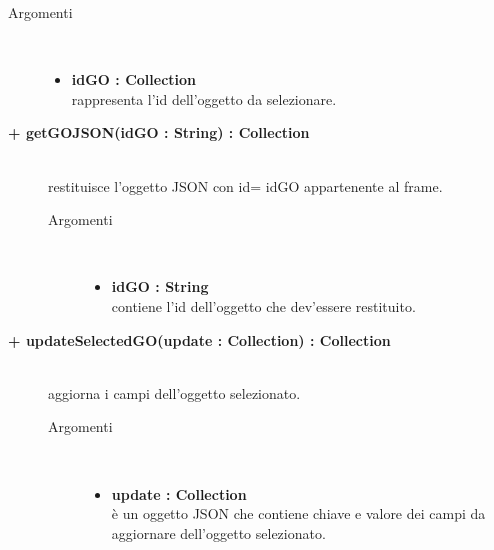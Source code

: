 \begin{description}
\begin{description}
\begin{description}
\begin{description}
			\item[Argomenti] \hfill \\
				\begin{itemize}
						\item \textbf{idGO : Collection			} \hfill \\
						rappresenta l'id dell'oggetto da selezionare.
				\end{itemize}

\end{description}

\end{description}

\begin{description}
		\item[\textbf{\color{blue}+ getGOJSON(idGO : String) : Collection			}] \hfill \\
			restituisce l'oggetto JSON con id= idGO appartenente al frame.   

\begin{description}
			\item[Argomenti] \hfill \\
				\begin{itemize}
						\item \textbf{idGO : String			} \hfill \\
					contiene l'id dell'oggetto che dev'essere restituito.
				\end{itemize}

\end{description}

\end{description}

\begin{description}
		\item[\textbf{\color{blue}+ updateSelectedGO(update : Collection) : Collection			}] \hfill \\
			aggiorna i campi dell'oggetto selezionato.   

\begin{description}
			\item[Argomenti] \hfill \\
				\begin{itemize}
						\item \textbf{update : Collection			} \hfill \\
					è un oggetto JSON che contiene chiave e valore dei campi da aggiornare dell'oggetto selezionato.
				\end{itemize}


\end{description}
\end{description}
\end{description}
\end{description}
